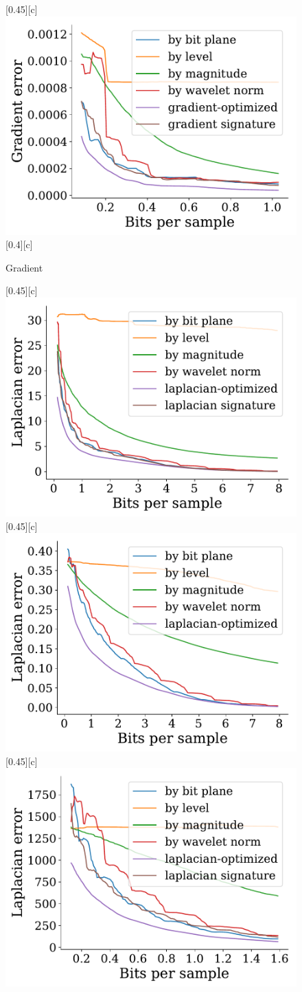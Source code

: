 \documentclass{article}
\begin{document}
\begin{figure}[htb]
        [0.45\linewidth][c]{%
                \includegraphics[width=0.4\linewidth]{img/supplementary/gradient-optimized-karfs}}
        [0.4\linewidth][c]{%
                }
        \caption{Gradient}
\end{figure}


\begin{figure}[htb]
        \centering
        [0.45\linewidth][c]{%
                \includegraphics[width=0.4\linewidth]{img/supplementary/laplacian-optimized-csafe}}
        [0.45\linewidth][c]{%
                \includegraphics[width=0.4\linewidth]{img/supplementary/laplacian-optimized-enzo-v}}
        [0.45\linewidth][c]{%
                \includegraphics[width=0.4\linewidth]{img/supplementary/laplacian-optimized-flame}}

\end{figure}
\end{document}
